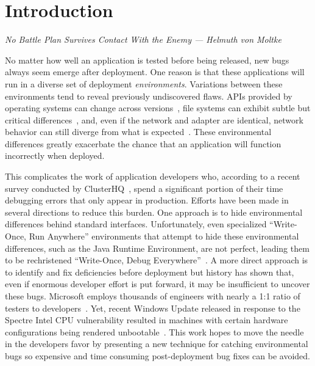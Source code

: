 \section{Introduction}
\label{SEC:introduction}
\textit{No Battle Plan Survives Contact With the Enemy --- Helmuth von Moltke}

No matter how well an application is tested before being released,
new bugs always seem emerge after deployment.
One reason is that these applications will run in a diverse set of
deployment \emph{environments}.
Variations between these environments tend to
reveal previously undiscovered flaws.
APIs provided by operating systems can change across versions~\cite{LinuxGlibcChanges},
file systems can exhibit subtle but critical differences~\cite{EXT4Layout, AppleHFS},
and, even if the network and adapter are identical,
network behavior can still diverge from what is expected~\cite{vbox}.
These environmental differences greatly exacerbate
the chance that an application will function incorrectly when deployed.

This complicates the work of application developers who, according to a
recent survey conducted by ClusterHQ~\cite{ClusterHQSurvey},
spend a significant portion of their time
debugging errors that only appear in production.
Efforts have been made in several directions to reduce this burden.  One
approach is to hide environmental differences behind standard interfaces.
Unfortunately, 
even specialized ``Write-Once, Run Anywhere'' environments
that attempt to hide these environmental differences,
such as the Java Runtime Environment,
are not perfect,
leading them to be rechristened ``Write-Once, Debug Everywhere''~\cite{WODE}.
A more direct approach is
to identify and fix deficiencies before deployment
but history has shown that,
even if enormous developer effort is put forward,
it may be insufficient to uncover these bugs.
Microsoft employs thousands of engineers with nearly a
1:1 ratio of testers to developers~\cite{Page2009}.
Yet, recent Windows Update released
in response to the Spectre Intel CPU vulnerability
resulted in machines with certain hardware configurations
being rendered unbootable~\cite{kb4056892}.
This work hopes to move the needle in the developers favor by presenting a
new technique for catching environmental bugs
so expensive and time consuming post-deployment bug fixes
can be avoided.

